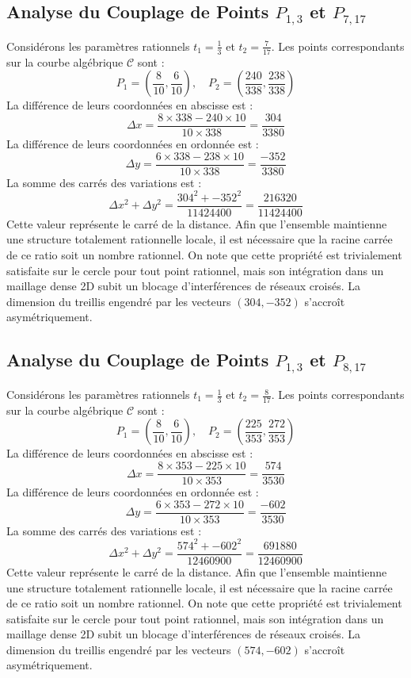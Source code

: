 \documentclass[12pt, a4paper]{article}
\begin{document}
\subsection{Analyse du Couplage de Points $P_{1,3}$ et $P_{7,17}$}
Considérons les paramètres rationnels $t_1 = \frac{1}{3}$ et $t_2 = \frac{7}{17}$.
Les points correspondants sur la courbe algébrique $\mathcal{C}$ sont :
$$ P_1 = \left( \frac{8}{10}, \frac{6}{10} \right), \quad P_2 = \left( \frac{240}{338}, \frac{238}{338} \right) $$
La différence de leurs coordonnées en abscisse est :
$$ \Delta x = \frac{8 \times 338 - 240 \times 10}{10 \times 338} = \frac{304}{3380} $$
La différence de leurs coordonnées en ordonnée est :
$$ \Delta y = \frac{6 \times 338 - 238 \times 10}{10 \times 338} = \frac{-352}{3380} $$
La somme des carrés des variations est :
$$ \Delta x^2 + \Delta y^2 = \frac{ 304^2 + -352^2 }{ 11424400 } = \frac{ 216320 }{ 11424400 } $$
Cette valeur représente le carré de la distance. Afin que l'ensemble maintienne une structure totalement rationnelle locale, il est nécessaire que la racine carrée de ce ratio soit un nombre rationnel. On note que cette propriété est trivialement satisfaite sur le cercle pour tout point rationnel, mais son intégration dans un maillage dense 2D subit un blocage d'interférences de réseaux croisés. La dimension du treillis engendré par les vecteurs $( 304, -352 )$ s'accroît asymétriquement.


\subsection{Analyse du Couplage de Points $P_{1,3}$ et $P_{8,17}$}
Considérons les paramètres rationnels $t_1 = \frac{1}{3}$ et $t_2 = \frac{8}{17}$.
Les points correspondants sur la courbe algébrique $\mathcal{C}$ sont :
$$ P_1 = \left( \frac{8}{10}, \frac{6}{10} \right), \quad P_2 = \left( \frac{225}{353}, \frac{272}{353} \right) $$
La différence de leurs coordonnées en abscisse est :
$$ \Delta x = \frac{8 \times 353 - 225 \times 10}{10 \times 353} = \frac{574}{3530} $$
La différence de leurs coordonnées en ordonnée est :
$$ \Delta y = \frac{6 \times 353 - 272 \times 10}{10 \times 353} = \frac{-602}{3530} $$
La somme des carrés des variations est :
$$ \Delta x^2 + \Delta y^2 = \frac{ 574^2 + -602^2 }{ 12460900 } = \frac{ 691880 }{ 12460900 } $$
Cette valeur représente le carré de la distance. Afin que l'ensemble maintienne une structure totalement rationnelle locale, il est nécessaire que la racine carrée de ce ratio soit un nombre rationnel. On note que cette propriété est trivialement satisfaite sur le cercle pour tout point rationnel, mais son intégration dans un maillage dense 2D subit un blocage d'interférences de réseaux croisés. La dimension du treillis engendré par les vecteurs $( 574, -602 )$ s'accroît asymétriquement.
\end{document}

